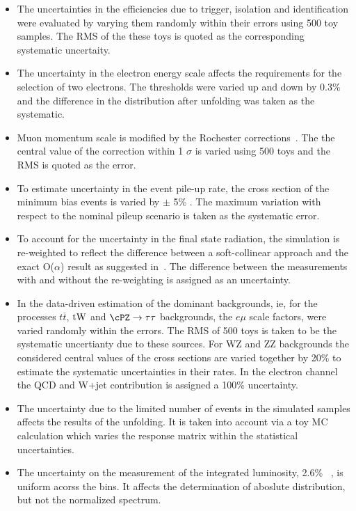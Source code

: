 \begin{itemize}
\item
 The uncertainties in the efficiencies due to trigger, isolation and 
identification were evaluated by varying them randomly within their errors
using  500 toy samples. The RMS of the these toys is quoted as the 
corresponding systematic uncertaity.

\item The uncertainty in the electron energy scale affects the \pt 
requirements for the selection of two electrons. The thresholds were 
varied up and down by 0.3\% and the difference in the \phistar 
distribution after unfolding was taken as the systematic.

\item Muon momentum scale is modified by the Rochester corrections~\cite{Rochester}. The the central value of the correction within 1 $\sigma$ is varied using 500 toys and the RMS is quoted as the error. 


\item To estimate  uncertainty in the event pile-up rate, the cross section
 of the minimum bias events is varied by $\pm$ 5\% . The maximum variation 
with respect to the
nominal pileup scenario is taken as the systematic error. 

\item To account for the uncertainty in the final state radiation, the 
simulation is re-weighted to reflect the
difference between a soft-collinear approach and the exact O($\alpha$)
result as suggested in~\cite{FSR}. The difference between the measurements
with and without the re-weighting is assigned as an uncertainty. 

\item In the data-driven estimation of the dominant backgrounds, ie, for 
the processes $t\overline{t}$, ${\rm tW}$ and $\cPZ\to\tau\tau$ backgrounds,
the $e\mu$ scale factors,  were varied randomly
within the errors. The RMS of 500 toys is taken to be the systematic
uncertianty due to these sources.
For WZ and ZZ backgrounds the considered central values of the cross sections are varied together by 20\% to estimate the systematic uncertainties in their rates. In the electron channel the QCD and W+jet contribution is assigned a 100\% uncertainty.  

\item The uncertainty due to the limited number of events in the simulated 
samples affects the results of the unfolding. It is taken into account 
via a toy MC calculation which varies
the response matrix within the statistical uncertainties.  

\item The uncertainty on the measurement of the integrated luminosity, 2.6\% ~\cite{CMS-PAS-LUM-13-001}, is uniform acorss the \phistar bins. It affects the determination of aboslute distribution, but not the normalized spectrum. 

\end{itemize}

